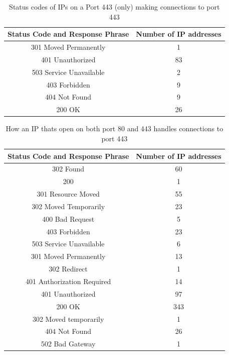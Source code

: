 \documentclass[a4wide,leqno,12pt]{report}
\begin{document}
\begin{table}[H]
\centering
\begin{tabular}{|| c c ||}
 \hline
  Status Code and Response Phrase & Number of IP addresses  \\ [0.5ex]
 \hline\hline
301 Moved Permanently		&1\\
401 Unauthorized		&83\\
503 Service Unavailable		&2\\
403 Forbidden			&9\\
404 Not Found			&9\\
200 OK				&26\\[1ex]
 \hline
\end{tabular}
\caption{Status codes of IPs on a Port 443 (only)  making connections to port 443}
\label{table:status_code_both_port_80}
\end{table}

\begin{table}[H]
\centering
\begin{tabular}{|| c c ||}
 \hline
  Status Code and Response Phrase & Number of IP addresses  \\ [0.5ex]
 \hline\hline
302 Found			&60\\
200				&1\\
301 Resource Moved		&55\\
302 Moved Temporarily		&23\\
400 Bad Request			&5\\
403 Forbidden			&23\\
503 Service Unavailable		&6\\
301 Moved Permanently		&13\\
302 Redirect			&1\\
401 Authorization Required	&14\\
401 Unauthorized		&97\\
200 OK				&343\\
302 Moved temporarily		&1\\
404 Not Found			&26\\
502 Bad Gateway			&1\\[1ex]
 \hline
\end{tabular}
\caption{How an IP thats open on both port 80 and 443 handles connections to port 443}
\label{table:status_code_both_port_80}
\end{table}
\end{document}
